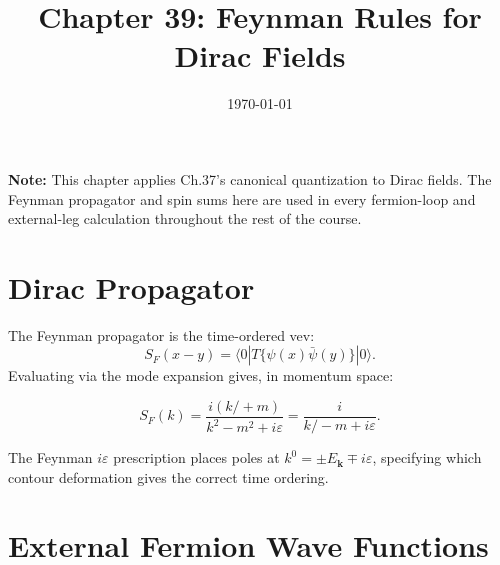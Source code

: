 \documentclass[12pt]{article}
\begin{document}
\title{Chapter 39: Feynman Rules for Dirac Fields}
\date{\today}
\maketitle

\begin{mdframed}[backgroundcolor=blue!5]
\textbf{Note:} This chapter applies Ch.37's canonical quantization to Dirac
fields. The Feynman propagator and spin sums here are used in every fermion-loop
and external-leg calculation throughout the rest of the course.
\end{mdframed}

\section{Dirac Propagator}\label{sec:propagator}

The Feynman propagator is the time-ordered vev:
\begin{equation}
S_F(x-y) = \langle0| T\{\psi(x)\bar\psi(y)\}|0\rangle .
\end{equation}
Evaluating via the mode expansion gives, in momentum space:
\begin{mdframed}[backgroundcolor=green!5]
\begin{equation}
S_F(k) = \frac{i(k\!\!\!/+m)}{k^2-m^2+i\varepsilon}
      = \frac{i}{k\!\!\!/-m+i\varepsilon} .
\tag{39.3}
\end{equation}
\end{mdframed}

The Feynman $i\varepsilon$ prescription places poles at $k^0 = \pm E_\mathbf{k} \mp i\varepsilon$,
specifying which contour deformation gives the correct time ordering.

\section{External Fermion Wave Functions}\label{sec:external}
\end{document}
